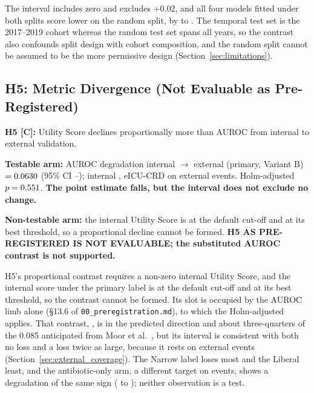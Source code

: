 The interval includes zero and excludes $+0.02$, and all four models fitted
under both splits score lower on the random split, by \pcSplitDeltaMinAbs{} to
\pcSplitDeltaMaxAbs. The temporal test set is the 2017--2019 cohort whereas the
random test set spans all years, so the contrast also confounds split design
with cohort composition, and the random split cannot be assumed to be the more
permissive design (Section~\ref{sec:limitations}).

\subsection{H5: Metric Divergence (Not Evaluable as Pre-Registered)}
\label{sec:h5}

\begin{mdframed}[backgroundcolor=ATUOrange!20, linecolor=ATUOrange]
    \textbf{H5 [C]:} Utility Score declines proportionally more than AUROC from
    internal to external validation.

    \textbf{Testable arm:} AUROC degradation internal $\to$ external (primary,
    Variant B) $= 0.0630$ (95\% CI \pcHFiveCiLo--\pcHFiveCiHi); internal
    \pcAurocPrimaryB, eICU-CRD \pcExtAurocPrimaryB{} on \pcExtNEventsB{}
    external events. Holm-adjusted $p = 0.551$.
    \textbf{The point estimate falls, but the interval does not exclude no
    change.}

    \textbf{Non-testable arm:} the internal Utility Score is
    \pcUtilityPrimaryB{} at the default cut-off and \pcUtilityMaxPrimaryB{} at
    its best threshold, so a proportional decline cannot be formed.
    \textbf{H5 AS PRE-REGISTERED IS NOT EVALUABLE; the substituted AUROC
    contrast is not supported.}
\end{mdframed}

H5's proportional contrast requires a non-zero internal Utility Score, and the
internal score under the primary label is \pcUtilityPrimaryB{} at the default
cut-off and \pcUtilityMaxPrimaryB{} at its best threshold, so the contrast
cannot be formed. Its slot is occupied by the AUROC limb alone (\S13.6 of
\texttt{00\_preregistration.md}), to which the Holm-adjusted \pcHFivePHolm{}
applies. That contrast, \pcHFiveEst{}, is in the predicted direction and about
three-quarters of the 0.085 anticipated from Moor et al.\
\cite{moor2023review}, but its interval is consistent with both no loss and a
loss twice as large, because it rests on \pcExtNEventsB{} external events
(Section~\ref{sec:external_coverage}). The Narrow label loses most and the
Liberal least, and the antibiotic-only arm, a different target on
\pcExtAbxNEventsB{} events, shows a degradation of the same sign
(\pcAurocPrimaryB{} to \pcExtAbxAurocPrimaryB); neither observation is a test.


